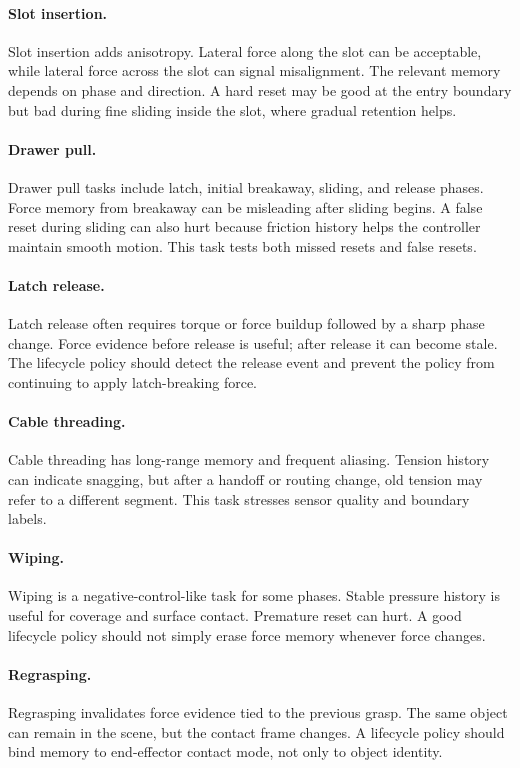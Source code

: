 \documentclass{article}
\begin{document}
\paragraph{Slot insertion.}
Slot insertion adds anisotropy. Lateral force along the slot can be acceptable,
while lateral force across the slot can signal misalignment. The relevant
memory depends on phase and direction. A hard reset may be good at the entry
boundary but bad during fine sliding inside the slot, where gradual retention
helps.

\paragraph{Drawer pull.}
Drawer pull tasks include latch, initial breakaway, sliding, and release
phases. Force memory from breakaway can be misleading after sliding begins. A
false reset during sliding can also hurt because friction history helps the
controller maintain smooth motion. This task tests both missed resets and false
resets.

\paragraph{Latch release.}
Latch release often requires torque or force buildup followed by a sharp phase
change. Force evidence before release is useful; after release it can become
stale. The lifecycle policy should detect the release event and prevent the
policy from continuing to apply latch-breaking force.

\paragraph{Cable threading.}
Cable threading has long-range memory and frequent aliasing. Tension history
can indicate snagging, but after a handoff or routing change, old tension may
refer to a different segment. This task stresses sensor quality and boundary
labels.

\paragraph{Wiping.}
Wiping is a negative-control-like task for some phases. Stable pressure history
is useful for coverage and surface contact. Premature reset can hurt. A good
lifecycle policy should not simply erase force memory whenever force changes.

\paragraph{Regrasping.}
Regrasping invalidates force evidence tied to the previous grasp. The same
object can remain in the scene, but the contact frame changes. A lifecycle
policy should bind memory to end-effector contact mode, not only to object
identity.
\end{document}
